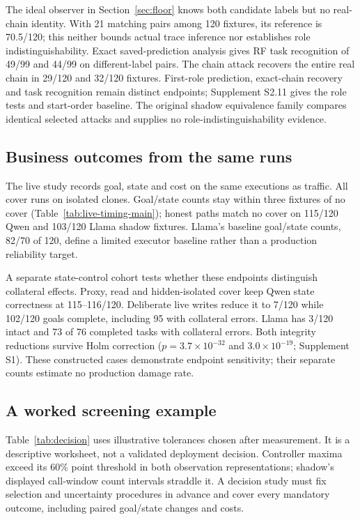 The ideal observer in Section~\ref{sec:floor} knows both candidate labels but no real-chain identity. With 21 matching pairs among 120 fixtures, its reference is 70.5/120; this neither bounds actual trace inference nor establishes role indistinguishability. Exact saved-prediction analysis gives RF task recognition of 49/99 and 44/99 on different-label pairs. The chain attack recovers the entire real chain in 29/120 and 32/120 fixtures. First-role prediction, exact-chain recovery and task recognition remain distinct endpoints; Supplement S2.11 gives the role tests and start-order baseline. The original shadow equivalence family compares identical selected attacks and supplies no role-indistinguishability evidence.

\subsection{Business outcomes from the same runs}\label{sec:state}
The live study records goal, state and cost on the same executions as traffic. All cover runs on isolated clones. Goal/state counts stay within three fixtures of no cover (Table~\ref{tab:live-timing-main}); honest paths match no cover on 115/120 Qwen and 103/120 Llama shadow fixtures. Llama's baseline goal/state counts, 82/70 of 120, define a limited executor baseline rather than a production reliability target.

A separate state-control cohort tests whether these endpoints distinguish collateral effects. Proxy, read and hidden-isolated cover keep Qwen state correctness at 115--116/120. Deliberate live writes reduce it to 7/120 while 102/120 goals complete, including 95 with collateral errors. Llama has 3/120 intact and 73 of 76 completed tasks with collateral errors. Both integrity reductions survive Holm correction ($p=3.7\times10^{-32}$ and $3.0\times10^{-19}$; Supplement S1). These constructed cases demonstrate endpoint sensitivity; their separate counts estimate no production damage rate.

\subsection{A worked screening example}\label{sec:decision}
Table~\ref{tab:decision} uses illustrative tolerances chosen after measurement. It is a descriptive worksheet, not a validated deployment decision. Controller maxima exceed its 60\% point threshold in both observation representations; shadow's displayed call-window count intervals straddle it. A decision study must fix selection and uncertainty procedures in advance and cover every mandatory outcome, including paired goal/state changes and costs.

